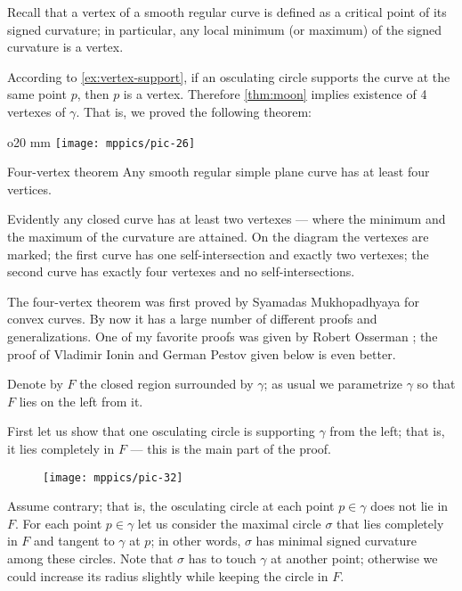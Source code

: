 Recall that a vertex of a smooth regular curve is defined as a critical point of its signed curvature;
in particular, any local minimum (or maximum) of the signed curvature is a vertex.

According to \ref{ex:vertex-support}, if an osculating circle supports the curve at the same point $p$, then $p$ is a vertex.
Therefore \ref{thm:moon} implies existence of 4 vertexes of $\gamma$.
That is, we proved the following theorem:

{

\begin{wrapfigure}{o}{20 mm}
\vskip-0mm
\centering
\texttt{[image: mppics/pic-26]}
\vskip0mm
\end{wrapfigure}

\begin{thm}{Four-vertex theorem}\label{thm:4-vert}
Any smooth regular simple plane curve has at least four
vertices.
\end{thm}

Evidently any closed curve has at least two vertexes --- where the minimum and the maximum of the curvature are attained.
On the diagram the vertexes are marked;
the first curve has one self-intersection and exactly two vertexes;
the second curve has exactly four vertexes and no self-intersections.

}

The four-vertex theorem was first proved by Syamadas Mukhopadhyaya \cite{mukhopadhyaya} for convex curves.
By now it has a large number of different proofs and generalizations.
One of my favorite proofs was given by Robert Osserman \cite{osserman};
the proof of Vladimir Ionin and German Pestov given below is even better.

Denote by $F$ the closed region surrounded by $\gamma$;
as usual we parametrize $\gamma$ so that $F$ lies on the left from it.

First let us show that one osculating circle is supporting $\gamma$ from the left; that is, it lies completely in $F$ --- this is the main part of the proof.

\begin{figure}[h!]%
\vskip-0mm
\centering
\texttt{[image: mppics/pic-32]}
\vskip0mm
\end{figure}

Assume contrary; that is, the osculating circle at each point $p\in \gamma$ does not lie in $F$.
For each point $p\in\gamma$ let us consider the maximal circle $\sigma$ that lies completely in $F$ and tangent to $\gamma$ at $p$;
in other words, $\sigma$ has minimal signed curvature among these circles.
Note that $\sigma$ has to touch $\gamma$ at another point;
otherwise we could increase its radius slightly while keeping the circle in $F$.

